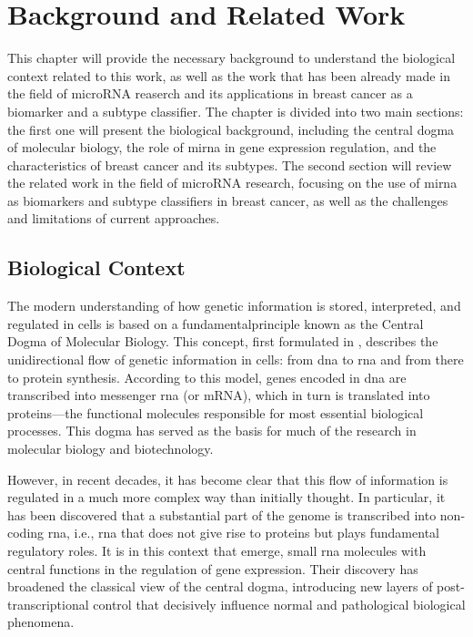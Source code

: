 
%

\chapter{Background and Related Work}

This chapter will provide the necessary background to understand the biological
context related to this work, as well as the work that has been already made in
the field of microRNA reaserch and its applications in breast cancer as a
biomarker and a subtype classifier. The chapter is divided into two main
sections: the first one will present the biological background, including the
central dogma of molecular biology, the role of \gls{mirna} in gene expression
regulation, and the characteristics of breast cancer and its subtypes. The
second section will review the related work in the field of microRNA research,
focusing on the use of \gls{mirna} as biomarkers and subtype classifiers in
breast cancer, as well as the challenges and limitations of current approaches.

\section{Biological Context}
The modern understanding of how genetic information is stored, interpreted, and
regulated in cells is based on a fundamentalprinciple known as the Central
Dogma of Molecular Biology. This concept, first formulated in
\textcites{discovery_dna_Watson1953The, updated_disc_of_dna_Pray2008DNA},
describes the unidirectional flow of genetic information in cells: from
\gls{dna} to \gls{rna} and from there to protein synthesis. According to this
model, genes encoded in \gls{dna} are transcribed into messenger \gls{rna} (or
mRNA), which in turn is translated into proteins—the functional molecules
responsible for most essential biological processes. This dogma has served as
the basis for much of the research in molecular biology and biotechnology.

However, in recent decades, it has become clear that this flow of information
is regulated in a much more complex way than initially thought. In particular,
it has been discovered that a substantial part of the genome is transcribed
into non-coding \gls{rna}, i.e., \gls{rna} that does not give rise to proteins
but plays fundamental regulatory roles. It is in this context that
 emerge, small \gls{rna} molecules with central functions in
the regulation of gene expression. Their discovery has broadened the classical
view of the central dogma, introducing new layers of post-transcriptional
control that decisively influence normal and pathological biological phenomena.


